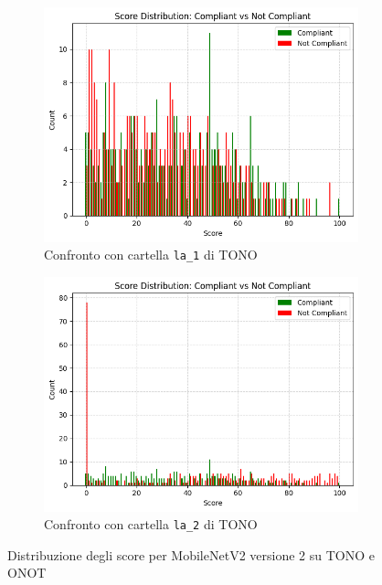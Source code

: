 \documentclass[12pt,a4paper,openright,twoside]{book}
\begin{document}
\begin{figure}[htbp]
    \centering
    \begin{subfigure}{0.49\textwidth}
        \centering
        \includegraphics[width=.7\linewidth]{figures/score-distribution-frontal-gaze-gdd-v2-la1.png}
        \caption{Confronto con cartella \texttt{la\_1} di TONO}
        \label{fig:score_distribution_frontal_gaze_gdd_v2_la1}
    \end{subfigure}
    \hfill
    \begin{subfigure}{0.49\textwidth}
        \centering
        \includegraphics[width=.7\linewidth]{figures/score-distribution-frontal-gaze-gdd-v2-la2.png}
        \caption{Confronto con cartella \texttt{la\_2} di TONO}
        \label{fig:score_distribution_frontal_gaze_gdd_v2_la2}
    \end{subfigure}
    \caption{Distribuzione degli score per MobileNetV2 versione 2 su TONO e ONOT}
\end{figure}
\end{document}
